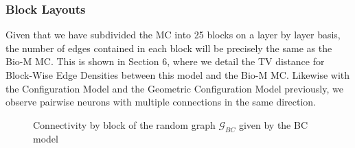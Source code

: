 \subsubsection{Block Layouts}
Given that we have subdivided the MC into 25 blocks on a layer by layer basis, the number of edges contained in each block will be precisely the same as the Bio-M MC. This is shown in Section 6, where we detail the TV distance for Block-Wise Edge Densities between this model and the Bio-M MC. Likewise with the Configuration Model and the Geometric Configuration Model previously, we observe pairwise neurons with multiple connections in the same direction.
\begin{figure}[H]%
    \centering
    \captionsetup{justification=centering}
    \qquad
    \caption{Connectivity by block of the random graph $\mathcal{G}_{BC}$ given by the BC model}%
    \label{fig:example}%
\end{figure}
